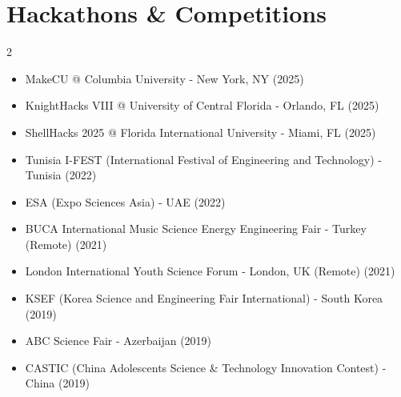 \documentclass[letterpaper,11pt]{article}
\begin{document}
\section{Hackathons \& Competitions}
        \begin{multicols}{2}
            \begin{itemize}[itemsep=0pt, parsep=0pt]
              \item MakeCU @ Columbia University - New York, NY (2025)
              \item KnightHacks VIII @ University of Central Florida - Orlando, FL (2025)
              \item ShellHacks 2025 @ Florida International University - Miami, FL (2025)
              \item Tunisia I-FEST (International Festival of Engineering and Technology) - Tunisia (2022)
              \item ESA (Expo Sciences Asia) - UAE (2022)
              \item BUCA International Music Science Energy Engineering Fair - Turkey (Remote) (2021)
              \item London International Youth Science Forum - London, UK (Remote) (2021)
              \item KSEF (Korea Science and Engineering Fair International) - South Korea (2019)
              \item ABC Science Fair - Azerbaijan (2019)
              \item CASTIC (China Adolescents Science \& Technology Innovation Contest) - China (2019)
            \end{itemize}
        \end{multicols}
\end{document}
